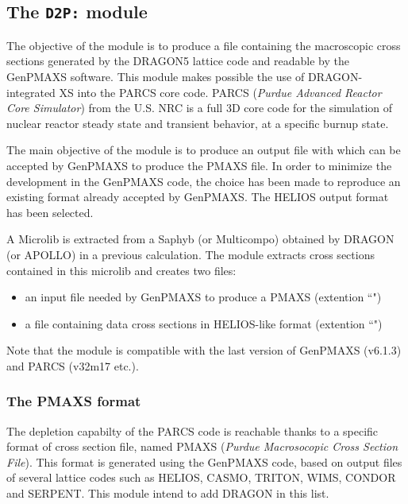\subsection{The {\tt D2P:} module}\label{sect:D2PData}

The objective of the  module is to produce a file containing the macroscopic cross sections generated by the DRAGON5 lattice code and readable by the GenPMAXS software. This module makes possible the use of DRAGON-integrated XS into the PARCS core code. PARCS (\textit{Purdue Advanced Reactor Core Simulator}) from the U.S. NRC \cite{PARCS} is a full 3D core code for the simulation of nuclear reactor steady state and transient behavior, at a specific burnup state.
 
\vskip 0.08cm

The main objective of the  module is to produce an output file with which can be accepted by GenPMAXS to produce the PMAXS file. In order to minimize the development in the GenPMAXS code, the choice has been made to reproduce an existing format already accepted by GenPMAXS. The HELIOS output format has been selected. 
 
\vskip 0.08cm

A Microlib is extracted from a Saphyb (or Multicompo) obtained by DRAGON (or APOLLO) in a previous calculation. The  module extracts cross sections contained in this microlib and creates two files: 
\begin{itemize}
\item an input file needed by GenPMAXS to produce a PMAXS (extention ``")
\item a file containing data cross sections in HELIOS-like format (extention ``")
\end{itemize}

Note that the  module  is compatible with the last version of GenPMAXS (v6.1.3) and PARCS (v32m17 etc.).
 
\subsubsection{The PMAXS format}\label{sect:PMAXS}

The depletion capabilty of the PARCS code is reachable thanks to a specific format of cross section file, named PMAXS (\textit{Purdue Macrosocopic Cross Section File})\cite{GENPMAXS}. This format is generated using the GenPMAXS code, based on output files of several lattice codes such as HELIOS, CASMO, TRITON, WIMS, CONDOR and SERPENT. This module intend to add DRAGON in this list.
 
